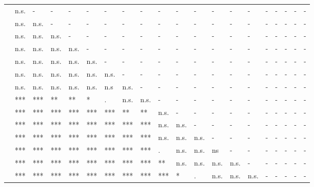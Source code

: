 \documentclass[11pt,fleqn]{article}
\newcommand{\6}{\mbox{$[\hspace*{-.6mm}[$}}
\newcommand{\9}{\mbox{$]\hspace*{-.6mm}]$}}
\begin{document}
\begin{table}[H]
\begin{tabular}{l l l l l l l l l l l l l l l l l l l l }
\midrule
\color{airforceblue}{\em be right}\color{black}		& n.s. & - & - & - & - & - & - & - & - & - & - & - & - & - & - & - & - & - & - \\
\color{brown}{\em suggest}\color{black}			& n.s. & n.s. & - & - & - & - & - & - & - & - & - & - & - & - & - & - & - & - & - \\
\color{brown}{\em say}	\color{black}		& n.s. & n.s. & n.s. & - & - & - & - & - & - & - & - & - & - & - & - & - & - & - & - \\
\color{black}{\em prove}\color{black}		& n.s. & n.s. & n.s. & n.s. & - & - & - & - & - & - & - & - & - & - & - & - & - & - & - \\
\color{brown}{\em think}\color{black}		& n.s. & n.s. & n.s. & n.s. & n.s. & - & - & - & - & - & - & - & - & - & - & - & - & - & - \\
\color{black}{\em confirm}\color{black}		& n.s. & n.s. & n.s. & n.s. & n.s. & n.s. & - & - & - & - & - & - & - & - & - & - & - & - & - \\
\color{black}{\em establish}\color{black}		& n.s. & n.s. & n.s. & n.s. & n.s. & n.s & n.s. & - & - & - & - & - & - & - & - & - & - & - & - \\
\color{airforceblue}{\em demonstrate}\color{black}		& *** & *** & ** & ** & * & . & n.s. & n.s. & - & - & - & - & - & - & - & - & - & - & - \\
\color{black}{\em announce}\color{black}		& *** & *** & *** & *** & *** & *** & ** & ** & n.s. & - & - & - & - & - & - & - & - & - & - \\
\color{black}{\em confess}\color{black}	& *** & *** & *** & *** & *** & *** & *** & *** & n.s. & n.s. & - & - & - & - & - & - & - & - & - \\
\color{blue}{\em reveal}\color{black}			& *** & *** & *** & *** & *** & *** & *** & *** & n.s. & n.s. & n.s. & - & - & - & - & - & - & - & - \\
\color{black}{\em admit}\color{black}		& *** & *** & *** & *** & *** & *** & *** & *** & . & n.s. & n.s. &  ns & - & - & - & - & - & - & - \\
\color{black}{\em acknowledge}\color{black}	& *** & *** & *** & *** & *** & *** & *** & *** & ** & n.s. & n.s. & n.s. & n.s. & - & - & - & - & - & - \\
\color{blue}{\em discover}\color{black}		& *** & *** & *** & *** & *** & *** & *** & *** & *** & * & . & n.s. & n.s. & n.s. & - & - & - & - & - \\

\end{tabular}
\end{table}
\end{document}
